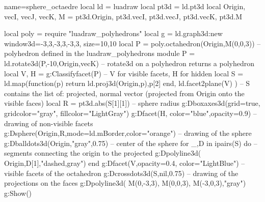 \begin{luadraw}{name=sphere_octaedre}
local ld = luadraw
local pt3d = ld.pt3d
local Origin, vecI, vecJ, vecK, M = pt3d.Origin, pt3d.vecI, pt3d.vecJ, pt3d.vecK, pt3d.M

local poly = require "luadraw_polyhedrons"
local g = ld.graph3d:new{ window3d={-3,3,-3,3,-3,3}, size={10,10}}
local P = poly.octahedron(Origin,M(0,0,3)) -- polyhedron defined in the luadraw_polyhedrons module
P = ld.rotate3d(P,-10,{Origin,vecK}) -- rotate3d on a polyhedron returns a polyhedron
local V, H = g:Classifyfacet(P) -- V for visible facets, H for hidden
local S = ld.map(function(p) return {ld.proj3d(Origin,p),p[2]} end, ld.facet2plane(V) )
-- S contains the list of: {projected, normal vector} (projected from Origin onto the visible faces)
local R = pt3d.abs(S[1][1]) -- sphere radius
g:Dboxaxes3d({grid=true, gridcolor="gray", fillcolor="LightGray"})
g:Dfacet(H, {color="blue",opacity=0.9}) -- drawing of non-visible facets
g:Dsphere(Origin,R,{mode=ld.mBorder,color="orange"}) -- drawing of the sphere
g:Dballdots3d(Origin,"gray",0.75) -- center of the sphere
for _,D in ipairs(S) do -- segments connecting the origin to the projected
    g:Dpolyline3d( {Origin,D[1]},"dashed,gray")
end
g:Dfacet(V,{opacity=0.4, color="LightBlue"}) -- visible facets of the octahedron
g:Dcrossdots3d(S,nil,0.75) -- drawing of the projections on the faces
g:Dpolyline3d( {M(0,-3,3), M(0,0,3), M(-3,0,3)},"gray")
g:Show()
\end{luadraw}
